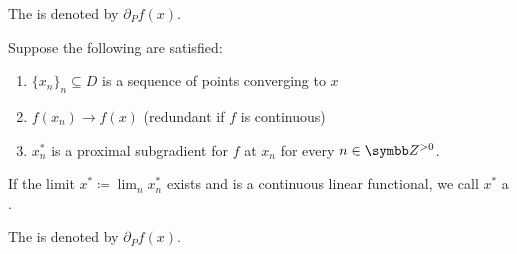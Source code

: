 \begin{definition}
\begin{defenum}
    The  is denoted by $\partial_P f(x)$.

    \item\label{def:subdifferentials/limiting}\cite[definition 11.10]{Clarke2013} Suppose the following are satisfied:
    \begin{enumerate}
      \item $\{ x_n \}_n \subseteq D$ is a sequence of points converging to $x$
      \item $f(x_n) \to f(x)$ (redundant if $f$ is continuous)
      \item $x_n^*$ is a proximal subgradient for $f$ at $x_n$ for every $n \in \BB{Z}^{>0}$.
    \end{enumerate}

    If the limit $x^* \coloneqq \lim_n x_n^*$ exists and is a continuous linear functional, we call $x^*$ a .

    The  is denoted by $\partial_P f(x)$.
  \end{defenum}
\end{definition}
